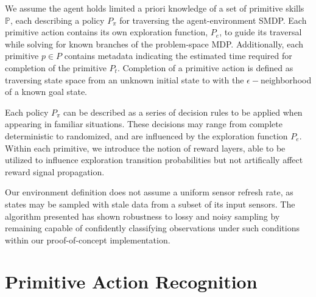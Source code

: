 \documentclass[letterpaper]{article}
\begin{document}
We assume the agent holds limited a priori knowledge of a set of primitive skills $\mathbb{P}$, each describing a policy $P_\pi$ for traversing the agent-environment SMDP. Each primitive action contains its own exploration function, $P_e$, to guide its traversal while solving for known branches of the problem-space MDP. Additionally, each primitive $p \in P$ contains metadata indicating the estimated time required for completion of the primitive $P_t$. Completion of a primitive action is defined as traversing state space from an unknown initial state to with the $\epsilon-$neighborhood of a known goal state.

Each policy $P_\pi$ can be described as a series of decision rules to be applied when appearing in familiar situations. These decisions may range from complete deterministic to randomized, and are influenced by the exploration function $P_e$. Within each primitive, we introduce the notion of reward layers, able to be utilized to influence exploration transition probabilities but not artifically affect reward signal propagation.

Our environment definition does not assume a uniform sensor refresh rate, as states may be sampled with stale data from a subset of its input sensors. The algorithm presented has shown robustness to lossy and noisy sampling by remaining capable of confidently classifying observations under such conditions within our proof-of-concept implementation.

\section{Primitive Action Recognition}
\end{document}
